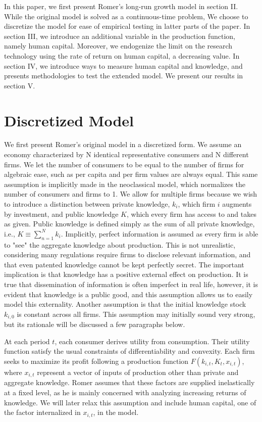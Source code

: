 \documentclass{amsart}
\begin{document}
In this paper, we first present Romer's long-run growth model in section II. While the original model is solved as a continuous-time problem, We choose to discretize the model for ease of empirical testing in latter parts of the paper. In section III, we introduce an additional variable in the production function, namely human capital. Moreover, we endogenize the limit on the research technology using the rate of return on human capital, a decreasing value. In section IV, we introduce ways to measure human capital and knowledge, and presents methodologies to test the extended model. We present our results in section V.
 
\section{Discretized Model}

We first present Romer's original model in a discretized form. We assume an economy characterized by N identical representative consumers and N different firms. We let the number of consumers to be equal to the number of firms for algebraic ease, such as per capita and per firm values are always equal. This same assumption is implicitly made in the neoclassical model, which normalizes the number of consumers and firms to 1. We allow for multiple firms because we wish to introduce a distinction between private knowledge, $k_i$, which firm $i$ augments by investment, and public knowledge $K$, which every firm has access to and takes as given. Public knowledge is defined simply as the sum of all private knowledge, i.e., $K \equiv \sum\limits_{n=1}^{N} k_i$. Implicitly, perfect information is assumed as every firm is able to "see" the aggregate knowledge about production. This is not unrealistic, considering many regulations require firms to disclose relevant information, and that even patented knowledge cannot be kept perfectly secret. The important implication is that knowledge has a positive external effect on production. It is true that dissemination of information is often imperfect in real life, however, it is evident that knowledge is a public good, and this assumption allows us to easily model this externality. Another assumption is that the initial knowledge stock $k_{i,0}$ is constant across all firms. This assumption may initially sound very strong, but its rationale will be discussed a few paragraphs below. 

At each period $t$, each consumer derives utility from consumption. Their utility function satisfy the usual constraints of differentiability and convexity. Each firm seeks to maximize its profit following a production function $F(k_{i,t},K_t,x_{i,t})$, where $x_{i,t}$ represent a vector of inputs of production other than private and aggregate knowledge. Romer assumes that these factors are supplied inelastically at a fixed level, as he is mainly concerned with analyzing increasing returns of knowledge. We will later relax this assumption and include human capital, one of the factor internalized in $x_{i,t}$, in the model. 
\end{document}
